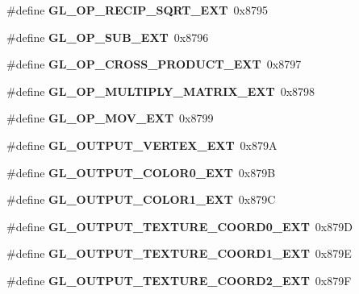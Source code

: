 \begin{DoxyCompactItemize}
\item 
\#define {\bfseries G\+L\+\_\+\+O\+P\+\_\+\+R\+E\+C\+I\+P\+\_\+\+S\+Q\+R\+T\+\_\+\+E\+X\+T}~0x8795\label{_s_d_l__opengl_8h_a1837774d916cc21a30d830800f9fc7d4}

\item 
\#define {\bfseries G\+L\+\_\+\+O\+P\+\_\+\+S\+U\+B\+\_\+\+E\+X\+T}~0x8796\label{_s_d_l__opengl_8h_a258c32c36fc6781c49e6b3702b330d97}

\item 
\#define {\bfseries G\+L\+\_\+\+O\+P\+\_\+\+C\+R\+O\+S\+S\+\_\+\+P\+R\+O\+D\+U\+C\+T\+\_\+\+E\+X\+T}~0x8797\label{_s_d_l__opengl_8h_a2919987fe6b7397e82734d6b370c5195}

\item 
\#define {\bfseries G\+L\+\_\+\+O\+P\+\_\+\+M\+U\+L\+T\+I\+P\+L\+Y\+\_\+\+M\+A\+T\+R\+I\+X\+\_\+\+E\+X\+T}~0x8798\label{_s_d_l__opengl_8h_a5382030c00e05ee3a1af8fb9b1cb2d65}

\item 
\#define {\bfseries G\+L\+\_\+\+O\+P\+\_\+\+M\+O\+V\+\_\+\+E\+X\+T}~0x8799\label{_s_d_l__opengl_8h_a14f7f1b96108f94bb5bb5f993c3531be}

\item 
\#define {\bfseries G\+L\+\_\+\+O\+U\+T\+P\+U\+T\+\_\+\+V\+E\+R\+T\+E\+X\+\_\+\+E\+X\+T}~0x879\+A\label{_s_d_l__opengl_8h_a615f875bdd94840f399047277076ae25}

\item 
\#define {\bfseries G\+L\+\_\+\+O\+U\+T\+P\+U\+T\+\_\+\+C\+O\+L\+O\+R0\+\_\+\+E\+X\+T}~0x879\+B\label{_s_d_l__opengl_8h_a6658254a5748548047bbfa77e81da14c}

\item 
\#define {\bfseries G\+L\+\_\+\+O\+U\+T\+P\+U\+T\+\_\+\+C\+O\+L\+O\+R1\+\_\+\+E\+X\+T}~0x879\+C\label{_s_d_l__opengl_8h_a9e0b24e6362e65333320a752b0699e24}

\item 
\#define {\bfseries G\+L\+\_\+\+O\+U\+T\+P\+U\+T\+\_\+\+T\+E\+X\+T\+U\+R\+E\+\_\+\+C\+O\+O\+R\+D0\+\_\+\+E\+X\+T}~0x879\+D\label{_s_d_l__opengl_8h_afb64e940c7403cd8266247db502717c1}

\item 
\#define {\bfseries G\+L\+\_\+\+O\+U\+T\+P\+U\+T\+\_\+\+T\+E\+X\+T\+U\+R\+E\+\_\+\+C\+O\+O\+R\+D1\+\_\+\+E\+X\+T}~0x879\+E\label{_s_d_l__opengl_8h_a1ee0e56aa24f1d3455e32e7b6801640f}

\item 
\#define {\bfseries G\+L\+\_\+\+O\+U\+T\+P\+U\+T\+\_\+\+T\+E\+X\+T\+U\+R\+E\+\_\+\+C\+O\+O\+R\+D2\+\_\+\+E\+X\+T}~0x879\+F\label{_s_d_l__opengl_8h_aca722c2681d07989003c35a29a8784f0}


\end{DoxyCompactItemize}
